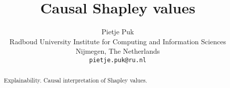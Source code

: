 \documentclass{article}
\title{Causal Shapley values}
\author{%
  Pietje Puk\\
  Radboud University
  Institute for Computing and Information Sciences\\
  Nijmegen, The Netherlands \\
  \texttt{pietje.puk@ru.nl} \\
}
\begin{document}
\maketitle

\begin{abstract}
Explainability. Causal interpretation of Shapley values.
\end{abstract}











\end{document}
